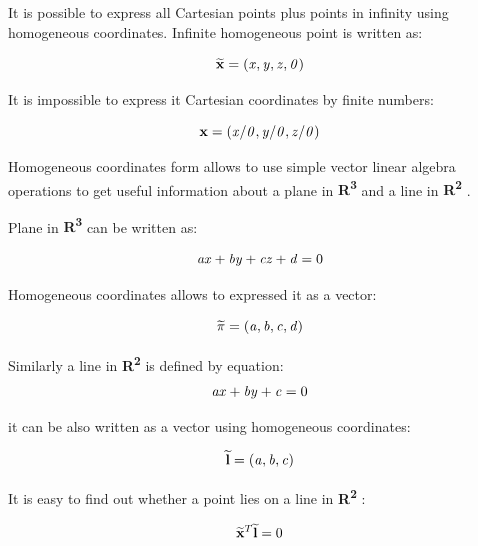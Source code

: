 \documentclass[a4paper,12pt]{article}
\newcommand{\evect}[1]{%
{\bf #1}%
}
\newcommand{\ehvect}[1]{%
{\bf \widetilde{#1}}%
}
\newcommand{\escal}[1]{%
{\it #1}%
}
\newcommand{\eucl}[1]{%
{\bf R\textsuperscript{#1}}%
}
\begin{document}
It is possible to express all Cartesian points plus points in infinity using homogeneous coordinates.
Infinite homogeneous point is written as: 

\begin{equation}
\ehvect{x} = (\escal{x}, \escal{y}, \escal{z}, \escal{0})
\end{equation}


It is impossible to express it Cartesian coordinates by finite numbers:

\begin{equation}
\evect{x} = (\escal{x} / \escal{0}, \escal{y} / \escal{0}, \escal{z} / \escal{0})
\end{equation}



Homogeneous coordinates form allows to 
use simple vector linear algebra operations 
to get useful information about a plane in \eucl{3} and a line in \eucl{2}.

Plane in \eucl{3} can be written as:

\begin{equation}
\escal{a}\escal{x} + \escal{b}\escal{y} + \escal{c}\escal{z} + \escal{d} = 0
\end{equation}

Homogeneous coordinates allows to expressed it as a vector:

\begin{equation}
\ehvect{\pi} =  (\escal{a}, \escal{b}, \escal{c}, \escal{d})
\end{equation}


Similarly a line in \eucl{2} is defined by equation:
\begin{equation}
\escal{a}\escal{x} + \escal{b}\escal{y} + \escal{c} = 0
\end{equation}

it can be also written as a vector using homogeneous coordinates:

\begin{equation}
\ehvect{l} =  (\escal{a}, \escal{b}, \escal{c})
\end{equation}

It is easy to find out whether a point lies on a line in \eucl{2}:

\begin{equation}
\ehvect{x}^{T} \ehvect{l} = 0
\end{equation}
\end{document}
